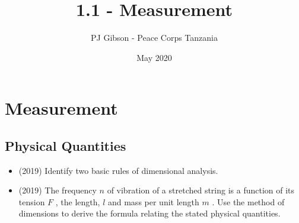 \documentclass{article}
\title{1.1 - Measurement}
\author{PJ Gibson - Peace Corps Tanzania}
\date{May 2020}
\begin{document}
\maketitle


\section{Measurement}

\subsection{Physical Quantities}
\begin{itemize}
\item (2019)  Identify two basic rules of dimensional analysis.
\item (2019)  The frequency $ n$ of vibration of a stretched string is a function of its tension $ F$ , the length, $ l$ and mass per unit length $ m$ . Use the method of dimensions to derive the formula relating the stated physical quantities.
\end{itemize}
\end{document}
